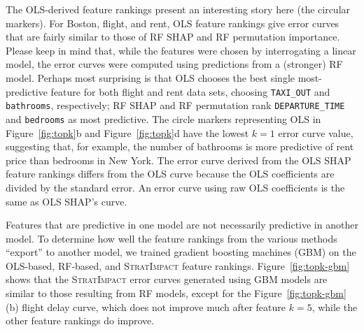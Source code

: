 \documentclass[smallextended]{svjour3}       %
\newcommand{\figref}[1]{Figure~\ref{#1}}
\newcommand{\cut}[1]{}
\newcommand{\todo}[1]{{{\small\color{red}{[#1]}}}}
\newcommand{\simp}{\fontfamily{cmr}\textsc{\small StratImpact}}
\begin{document}
The OLS-derived feature rankings present an interesting story here (the circular markers). For Boston, flight, and rent, OLS feature rankings give error curves that are fairly similar to those of RF SHAP and RF permutation importance.  Please keep in mind that, while the features were chosen by interrogating a linear model, the error curves were  computed using predictions from a (stronger) RF model.  Perhaps most surprising is that OLS chooses the best single most-predictive feature for both flight and rent data sets, choosing {\tt TAXI\_OUT} and {\tt bathrooms}, respectively; RF SHAP and RF permutation rank {\tt DEPARTURE\_TIME} and {\tt bedrooms} as most predictive. The circle markers representing OLS in \figref{fig:topk}b and \figref{fig:topk}d have the lowest $k=1$ error curve value,  suggesting that, for example, the number of bathrooms is more predictive of rent price than bedrooms in New York. The error curve derived from the OLS SHAP feature rankings differs from the OLS curve because the OLS coefficients are divided by the standard error. An error curve using raw OLS coefficients is the same as OLS SHAP's curve.

\cut{
\begin{figure}
\centering
\begin{subfigure}{.245\textwidth}
    \centering
\texttt{[image: images/boston-topk-RF-Impact.pdf]}
\subcaption{}
\end{subfigure}%
\hfill
\begin{subfigure}{.245\textwidth}
    \centering
\texttt{[image: images/flights-topk-RF-Impact.pdf]}
\subcaption{}
\end{subfigure}
\hfill
\begin{subfigure}{.245\textwidth}
    \centering
\texttt{[image: images/bulldozer-topk-RF-Impact.pdf]}
\subcaption{}
\end{subfigure}%
\hfill
\begin{subfigure}{.245\textwidth}
    \centering
\texttt{[image: images/rent-topk-RF-Impact.pdf]}
\subcaption{}
\end{subfigure}
\caption[short]{\small MAE curves as in \figref{fig:topk} except using \simp{} {\em impact} rather than {\em importance}. \todo{merge with previous importance graphs?}}
\label{fig:topk-impact}
\end{figure}
}

Features that are predictive in one model are not necessarily predictive in another model.  To determine how well the feature rankings from the various methods ``export'' to another model, we trained gradient boosting machines (GBM) on the OLS-based, RF-based, and \simp{} feature rankings.  \figref{fig:topk-gbm} shows that the \simp{} error curves generated using GBM models are similar to those resulting from RF models, except for the \figref{fig:topk-gbm}(b) flight delay curve, which does not improve much after feature $k=5$, while the other feature rankings do improve. 
\end{document}
